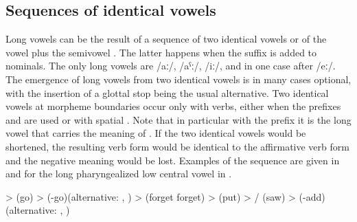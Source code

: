 
\subsection{Sequences of identical vowels}
\label{ssec:Sequences of identical vowels}

Long vowels can be the result of a sequence of two identical vowels or of the vowel  plus the semivowel . The latter happens when the  suffix is added to nominals. The only long vowels are /aː/, /aˁː/, /iː/, and in one case after  /eː/. The emergence of long vowels from two identical vowels is in many cases optional, with the insertion of a glottal stop being the usual alternative. Two identical vowels at morpheme boundaries occur only with verbs, either when the  prefixes  and  are used or with spatial . Note that in particular with the  prefix it is the long vowel that carries the meaning of . If the two identical vowels would be shortened, the resulting verb form would be identical to the affirmative verb form and the negative meaning would be lost. Examples of the sequence are given in  and for the long pharyngealized low central vowel in .
%
\begin{exe}
	\ex	\label{ex:identical vowels A phon}
	\begin{xlist}
		\ex	{} >   (go)
		\ex	{} >   (-go)\newline\hspace*{1em}(alternative: , )
		\ex	{} >  \newline\hspace*{1em}(forget forget) 
		\ex	{} >  \newline\hspace*{1em}(put)
		\ex	{} > \slash{}  (saw)
		\ex	{} >   (-add)\newline\hspace*{1em}(alternative: , )
	\end{xlist}
\end{exe}

